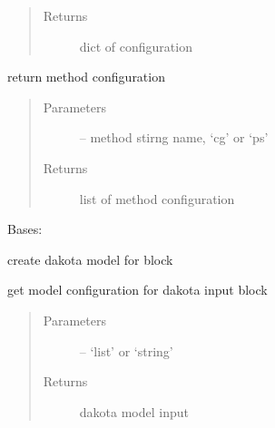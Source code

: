 \documentclass[letterpaper,10pt,english]{sphinxmanual}
\begin{document}
\begin{fulllineitems}
\begin{fulllineitems}
\begin{quote}
\begin{description}
\item[{Returns}] \leavevmode
dict of configuration

\end{description}\end{quote}

\end{fulllineitems}


\begin{fulllineitems}
\label{\detokenize{src/apidocs/dakutils:genopt.dakutils.DakotaMethod.method}}
return method configuration
\begin{quote}\begin{description}
\item[{Parameters}] \leavevmode
{} -- method stirng name, `cg' or `ps'

\item[{Returns}] \leavevmode
list of method configuration

\end{description}\end{quote}

\end{fulllineitems}


\end{fulllineitems}


\begin{fulllineitems}
\label{\detokenize{src/apidocs/dakutils:genopt.dakutils.DakotaModel}}
Bases: \href{https://docs.python.org/2/library/functions.html\#object}{}

create dakota model for  block

\begin{fulllineitems}
\label{\detokenize{src/apidocs/dakutils:genopt.dakutils.DakotaModel.get_config}}
get model configuration for dakota input block
\begin{quote}\begin{description}
\item[{Parameters}] \leavevmode
{} -- `list' or `string'

\item[{Returns}] \leavevmode
dakota model input

\end{description}\end{quote}

\end{fulllineitems}


\end{fulllineitems}
\end{document}
